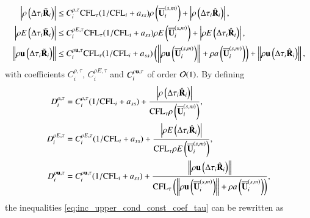 \begin{equation}
    \begin{aligned}
    \label{eq:inc_upper_cond_const_coef_tau}
        \left| \rho\left( \mathrm\Delta\tau_i \tilde{\mathbf{R}}_i \right) \right|
        & \leq
        C^{\rho,\tau}_i \text{CFL}_\tau(1 / \text{CFL}_i + a_{ss})
        \rho\left( \overline{\mathbf{U}}_i^{\left(s,m\right)} \right)
        + \left| \rho\left(\mathrm\Delta\tau_i\hat{\mathbf{R}}_i\right) \right|,\\
        \left| \rho E\left(\mathrm\Delta\tau_i \tilde{\mathbf{R}}_i \right) \right|
        & \leq
        C^{\rho E,\tau}_i \text{CFL}_\tau(1 / \text{CFL}_i + a_{ss})
        \rho E\left( \overline{\mathbf{U}}_i^{\left(s,m\right)} \right)
        + \left | \rho E\left(\mathrm\Delta\tau_i\hat{\mathbf{R}}_i\right) \right|,\\
        \left\| \rho \mathbf{u}\left( \mathrm\Delta\tau_i \tilde{\mathbf{R}}_i \right) \right\|
        & \leq
        C^{\rho \mathbf{u},\tau}_i \text{CFL}_\tau(1 / \text{CFL}_i + a_{ss})
        \left(
        \left\| \rho \mathbf{u}\left( \overline{\mathbf{U}}_i^{\left(s,m\right)} \right) \right\|
        + \rho a\left(\overline{\mathbf{U}}_i^{\left(s,m\right)}\right)
        \right)
        + \left\|\rho\mathbf{u}\left(\mathrm\Delta\tau_i\hat{\mathbf{R}}_i\right) \right\|,\\
    \end{aligned}
\end{equation}
with coefficients $C^{\rho ,\tau}_i$, $C^{\rho E,\tau}_i$ and $C^{\rho \mathbf{u},\tau}_i$
of order $\mathcal{O}(1)$.
By defining
\begin{equation}
    \begin{aligned}
    \label{eq:inc_upper_cond_const_coef_tau_recast_method}
        D^{\rho,\tau}_i
        & =
        C^{\rho,\tau}_i (1 / \text{CFL}_i + a_{ss})
        + \frac{\left| \rho\left(\mathrm\Delta\tau_i \hat{\mathbf{R}}_i\right) \right|}
        { \text{CFL}_\tau\rho\left( \overline{\mathbf{U}}_i^{\left(s,m\right)} \right)},
        \\
        D^{\rho E,\tau}_i
        & =
        C^{\rho E,\tau}_i (1 / \text{CFL}_i + a_{ss})
        + \frac{\left| \rho E\left(\mathrm\Delta\tau_i \hat{\mathbf{R}}_i\right) \right|}
        { \text{CFL}_\tau\rho E\left( \overline{\mathbf{U}}_i^{\left(s,m\right)} \right)},
        \\
        D^{\rho \mathbf{u},\tau}_i
        & =
        C^{\rho \mathbf{u},\tau}_i (1 / \text{CFL}_i + a_{ss})
        + \frac{\left\|\rho\mathbf{u}\left(\mathrm\Delta\tau_i \hat{\mathbf{R}}_i\right) \right\|}
        { \text{CFL}_\tau
        \left(
        \left\|\rho \mathbf{u}\left( \overline{\mathbf{U}}_i^{\left(s,m\right)} \right)\right\|
        + \rho a\left(\overline{\mathbf{U}}_i^{\left(s,m\right)}\right)
        \right)
        }
        ,\\
    \end{aligned}
\end{equation}
the inequalities \eqref{eq:inc_upper_cond_const_coef_tau} can be 
rewritten as

